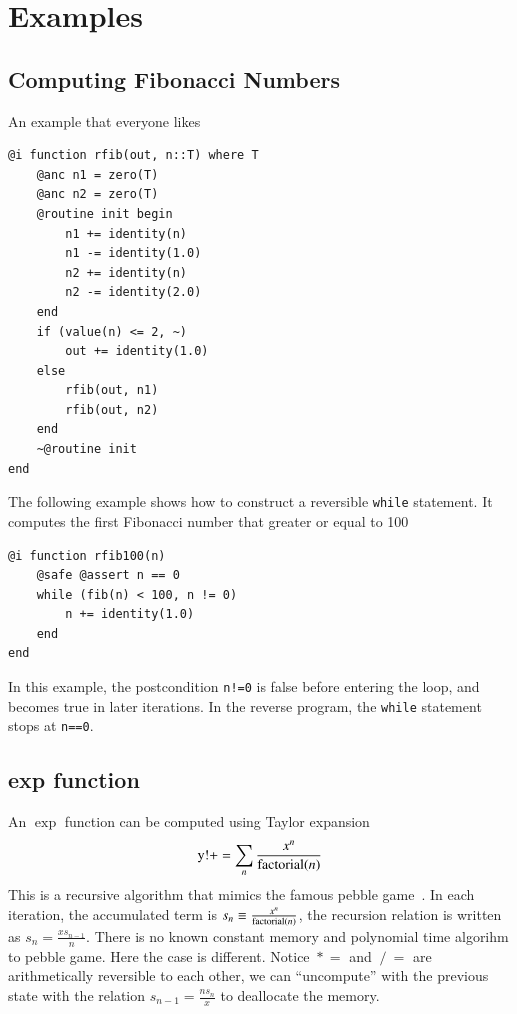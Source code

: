 \documentclass[aps,twocolumn,longbibliography,english,superscriptaddress,prr]{revtex4-1}
\newcommand{\<}{\langle}
\renewcommand{\>}{\rangle}
\theoremstyle{definition}\newtheorem{definition}{\textit{Definition}}
\begin{document}
\section{Examples}\label{sec:example}

\subsection{Computing Fibonacci Numbers}\label{sec:fib}
An example that everyone likes

\begin{minipage}{.44\textwidth}
\begin{lstlisting}
@i function rfib(out, n::T) where T
    @anc n1 = zero(T)
    @anc n2 = zero(T)
    @routine init begin
        n1 += identity(n)
        n1 -= identity(1.0)
        n2 += identity(n)
        n2 -= identity(2.0)
    end
    if (value(n) <= 2, ~)
        out += identity(1.0)
    else
        rfib(out, n1)
        rfib(out, n2)
    end
    ~@routine init
end
\end{lstlisting}
\end{minipage}

The following example shows how to construct a reversible \texttt{while} statement. It computes the first Fibonacci number that greater or equal to 100

\begin{minipage}{.44\textwidth}
\begin{lstlisting}
@i function rfib100(n)
    @safe @assert n == 0
    while (fib(n) < 100, n != 0)
        n += identity(1.0)
    end
end
\end{lstlisting}
\end{minipage}

In this example, the postcondition \texttt{n!=0} is false before entering the loop, and becomes true in later iterations. In the reverse program, the \texttt{while} statement stops at \texttt{n==0}.

\subsection{exp function}\label{sec:exp}
An $\exp$ function can be computed using Taylor expansion
\begin{equation}
    {\rm y!} += \sum\limits_n \frac{x^n}{{\rm factorial}(n)}
\end{equation}
This is a recursive algorithm that mimics the famous pebble game~\cite{Perumalla2013}.
In each iteration, the accumulated term is $s_n \equiv \frac{x^n}{{\rm factorial}(n)}$, the recursion relation is written as $s_n = \frac{x s_{n-1}}{n}$. There is no known constant memory and polynomial time algorihm to pebble game.
Here the case is different. Notice $\mathrel{*}=$ and $\mathrel{/}=$ are arithmetically reversible to each other, we can ``uncompute'' with the previous state with the relation $s_{n-1} = \frac{n s_n}{x}$ to deallocate the memory.
\end{document}
